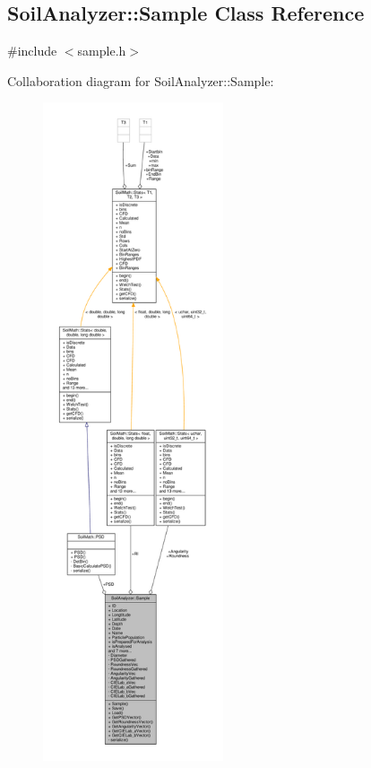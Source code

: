 \hypertarget{class_soil_analyzer_1_1_sample}{}\subsection{Soil\+Analyzer\+:\+:Sample Class Reference}
\label{class_soil_analyzer_1_1_sample}


{\ttfamily \#include $<$sample.\+h$>$}



Collaboration diagram for Soil\+Analyzer\+:\+:Sample\+:
\nopagebreak
\begin{figure}[H]
\begin{center}
\leavevmode
\includegraphics[height=550pt]{class_soil_analyzer_1_1_sample__coll__graph}
\end{center}
\end{figure}
